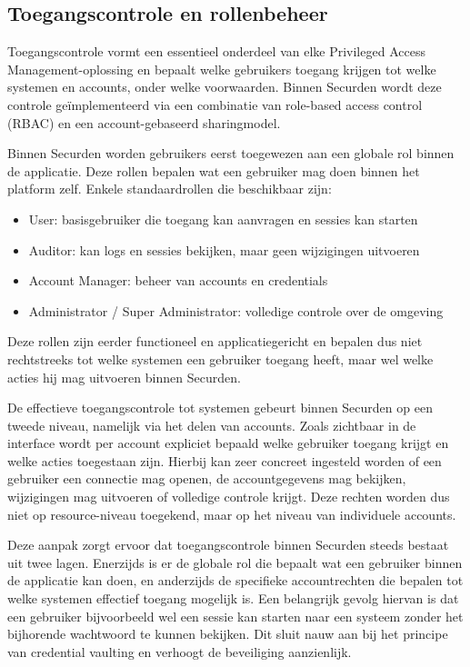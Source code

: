 \subsection{Toegangscontrole en rollenbeheer}
Toegangscontrole vormt een essentieel onderdeel van elke Privileged Access Management-oplossing en bepaalt welke gebruikers toegang krijgen tot welke systemen en accounts, onder welke voorwaarden. Binnen Securden wordt deze controle geïmplementeerd via een combinatie van role-based access control (RBAC) en een account-gebaseerd sharingmodel.

Binnen Securden worden gebruikers eerst toegewezen aan een globale rol binnen de applicatie. Deze rollen bepalen wat een gebruiker mag doen binnen het platform zelf. Enkele standaardrollen die beschikbaar zijn:
\begin{itemize}
	\item User: basisgebruiker die toegang kan aanvragen en sessies kan starten 
	\item Auditor: kan logs en sessies bekijken, maar geen wijzigingen uitvoeren 
	\item Account Manager: beheer van accounts en credentials 
	\item Administrator / Super Administrator: volledige controle over de omgeving 
\end{itemize}
Deze rollen zijn eerder functioneel en applicatiegericht en bepalen dus niet rechtstreeks tot welke systemen een gebruiker toegang heeft, maar wel welke acties hij mag uitvoeren binnen Securden.

De effectieve toegangscontrole tot systemen gebeurt binnen Securden op een tweede niveau, namelijk via het delen van accounts. Zoals zichtbaar in de interface wordt per account expliciet bepaald welke gebruiker toegang krijgt en welke acties toegestaan zijn. Hierbij kan zeer concreet ingesteld worden of een gebruiker een connectie mag openen, de accountgegevens mag bekijken, wijzigingen mag uitvoeren of volledige controle krijgt. Deze rechten worden dus niet op resource-niveau toegekend, maar op het niveau van individuele accounts.

Deze aanpak zorgt ervoor dat toegangscontrole binnen Securden steeds bestaat uit twee lagen. Enerzijds is er de globale rol die bepaalt wat een gebruiker binnen de applicatie kan doen, en anderzijds de specifieke accountrechten die bepalen tot welke systemen effectief toegang mogelijk is. Een belangrijk gevolg hiervan is dat een gebruiker bijvoorbeeld wel een sessie kan starten naar een systeem zonder het bijhorende wachtwoord te kunnen bekijken. Dit sluit nauw aan bij het principe van credential vaulting en verhoogt de beveiliging aanzienlijk.

